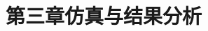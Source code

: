 \documentclass[UTF8,zihao=5,fontset=windows]{ctexart}
\begin{document}
\section*{第三章\quad 仿真与结果分析}
\setcounter{section}{3}

\end{document}
